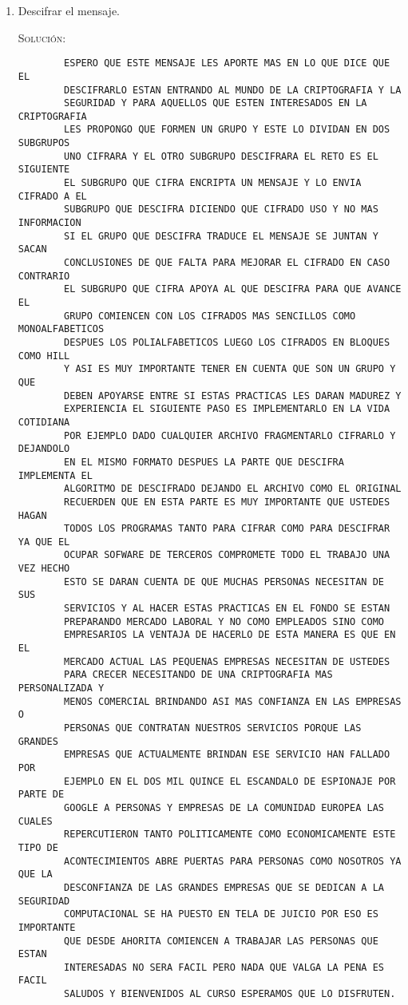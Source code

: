 \documentclass[letterpaper,11pt]{article}
\begin{document}
\begin{enumerate}
\begin{enumerate}
        \item Descifrar el mensaje.
        
        \textsc{Solución:}
        \begin{verbatim}
        ESPERO QUE ESTE MENSAJE LES APORTE MAS EN LO QUE DICE QUE EL 
        DESCIFRARLO ESTAN ENTRANDO AL MUNDO DE LA CRIPTOGRAFIA Y LA 
        SEGURIDAD Y PARA AQUELLOS QUE ESTEN INTERESADOS EN LA CRIPTOGRAFIA 
        LES PROPONGO QUE FORMEN UN GRUPO Y ESTE LO DIVIDAN EN DOS SUBGRUPOS 
        UNO CIFRARA Y EL OTRO SUBGRUPO DESCIFRARA EL RETO ES EL SIGUIENTE 
        EL SUBGRUPO QUE CIFRA ENCRIPTA UN MENSAJE Y LO ENVIA CIFRADO A EL 
        SUBGRUPO QUE DESCIFRA DICIENDO QUE CIFRADO USO Y NO MAS INFORMACION     
        SI EL GRUPO QUE DESCIFRA TRADUCE EL MENSAJE SE JUNTAN Y SACAN 
        CONCLUSIONES DE QUE FALTA PARA MEJORAR EL CIFRADO EN CASO CONTRARIO 
        EL SUBGRUPO QUE CIFRA APOYA AL QUE DESCIFRA PARA QUE AVANCE EL     
        GRUPO COMIENCEN CON LOS CIFRADOS MAS SENCILLOS COMO MONOALFABETICOS 
        DESPUES LOS POLIALFABETICOS LUEGO LOS CIFRADOS EN BLOQUES COMO HILL 
        Y ASI ES MUY IMPORTANTE TENER EN CUENTA QUE SON UN GRUPO Y QUE 
        DEBEN APOYARSE ENTRE SI ESTAS PRACTICAS LES DARAN MADUREZ Y 
        EXPERIENCIA EL SIGUIENTE PASO ES IMPLEMENTARLO EN LA VIDA COTIDIANA 
        POR EJEMPLO DADO CUALQUIER ARCHIVO FRAGMENTARLO CIFRARLO Y DEJANDOLO 
        EN EL MISMO FORMATO DESPUES LA PARTE QUE DESCIFRA IMPLEMENTA EL 
        ALGORITMO DE DESCIFRADO DEJANDO EL ARCHIVO COMO EL ORIGINAL 
        RECUERDEN QUE EN ESTA PARTE ES MUY IMPORTANTE QUE USTEDES HAGAN 
        TODOS LOS PROGRAMAS TANTO PARA CIFRAR COMO PARA DESCIFRAR YA QUE EL 
        OCUPAR SOFWARE DE TERCEROS COMPROMETE TODO EL TRABAJO UNA VEZ HECHO 
        ESTO SE DARAN CUENTA DE QUE MUCHAS PERSONAS NECESITAN DE SUS 
        SERVICIOS Y AL HACER ESTAS PRACTICAS EN EL FONDO SE ESTAN  
        PREPARANDO MERCADO LABORAL Y NO COMO EMPLEADOS SINO COMO 
        EMPRESARIOS LA VENTAJA DE HACERLO DE ESTA MANERA ES QUE EN EL 
        MERCADO ACTUAL LAS PEQUENAS EMPRESAS NECESITAN DE USTEDES 
        PARA CRECER NECESITANDO DE UNA CRIPTOGRAFIA MAS PERSONALIZADA Y 
        MENOS COMERCIAL BRINDANDO ASI MAS CONFIANZA EN LAS EMPRESAS O 
        PERSONAS QUE CONTRATAN NUESTROS SERVICIOS PORQUE LAS GRANDES 
        EMPRESAS QUE ACTUALMENTE BRINDAN ESE SERVICIO HAN FALLADO POR 
        EJEMPLO EN EL DOS MIL QUINCE EL ESCANDALO DE ESPIONAJE POR PARTE DE 
        GOOGLE A PERSONAS Y EMPRESAS DE LA COMUNIDAD EUROPEA LAS CUALES 
        REPERCUTIERON TANTO POLITICAMENTE COMO ECONOMICAMENTE ESTE TIPO DE 
        ACONTECIMIENTOS ABRE PUERTAS PARA PERSONAS COMO NOSOTROS YA QUE LA 
        DESCONFIANZA DE LAS GRANDES EMPRESAS QUE SE DEDICAN A LA SEGURIDAD 
        COMPUTACIONAL SE HA PUESTO EN TELA DE JUICIO POR ESO ES IMPORTANTE 
        QUE DESDE AHORITA COMIENCEN A TRABAJAR LAS PERSONAS QUE ESTAN 
        INTERESADAS NO SERA FACIL PERO NADA QUE VALGA LA PENA ES FACIL 
        SALUDOS Y BIENVENIDOS AL CURSO ESPERAMOS QUE LO DISFRUTEN.
        \end{verbatim}
    \end{enumerate}
    

\end{enumerate}
\end{document}
